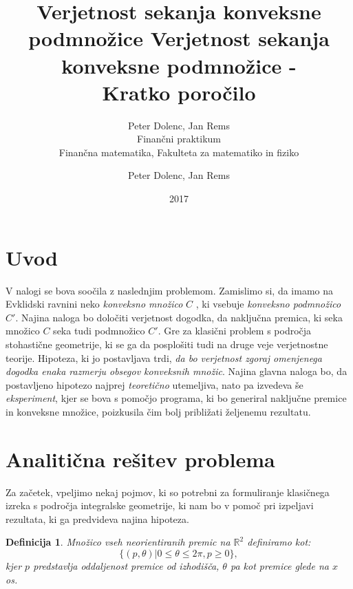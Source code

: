 \documentclass[a4paper]{article}
\title{Verjetnost sekanja konveksne podmnožice}
\author{Peter Dolenc, Jan Rems \\ Finančni praktikum \\ Finančna matematika, Fakulteta za matematiko in fiziko}
\date{2017}
\newtheorem{definicija}{Definicija}
\begin{document}
\title{%
  Verjetnost sekanja konveksne podmnožice -\\
   \large Kratko poročilo \\}

\author{Peter Dolenc, Jan Rems}

\maketitle

\pagebreak

\section{Uvod}


V nalogi se bova soočila z naslednjim problemom. Zamislimo si, da imamo na Evklidski ravnini neko \textit{konveksno množico} $C$ , ki vsebuje \textit{konveksno podmnožico } $C'$. Najina naloga bo določiti verjetnost dogodka, da naključna premica, ki seka množico $C$ seka tudi podmnožico $C'$. Gre za klasični problem s področja stohastične geometrije, ki se ga da posplošiti tudi na druge veje verjetnostne teorije. Hipoteza, ki jo postavljava trdi, \textit{da bo verjetnost zgoraj omenjenega dogodka enaka razmerju obsegov konveksnih množic}. Najina glavna naloga bo, da postavljeno hipotezo najprej \textit{teoretično} utemeljiva, nato pa izvedeva še \textit{eksperiment}, kjer se bova s pomočjo programa, ki bo generiral naključne premice in konveksne množice, poizkusila čim bolj približati željenemu rezultatu. 


\vspace{4 mm}


\section{Analitična rešitev problema}

Za začetek, vpeljimo nekaj pojmov, ki so potrebni za formuliranje klasičnega izreka s področja integralske geometrije, ki nam bo v pomoč pri izpeljavi rezultata, ki ga predvideva najina hipoteza.

\begin{definicija}
Množico vseh neorientiranih premic na $\mathbb{R}^2$ definiramo kot: $$ \{ (p,\theta)|0 \le \theta \le 2 \pi , p \ge 0\},$$ kjer $p$ predstavlja oddaljenost premice od izhodišča, $\theta$ pa kot premice glede na $x$ os.
\end{definicija}

\vspace{3 mm}
\end{document}
